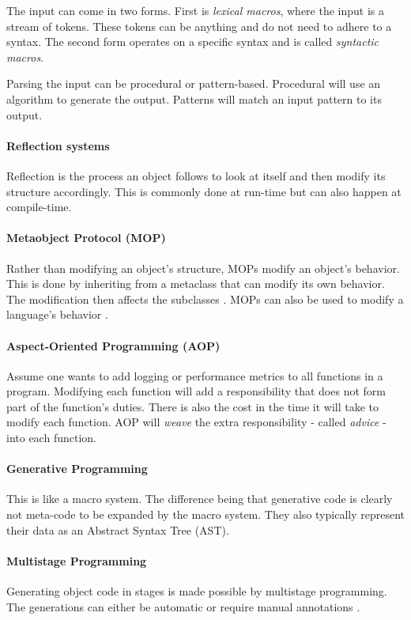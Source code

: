 The input can come in two forms.
First is \textit{lexical macros}, where the input is a stream of tokens.
These tokens can be anything and do not need to adhere to a syntax.
The second form operates on a specific syntax and is called \textit{syntactic macros}.

Parsing the input can be procedural or pattern-based.
Procedural will use an algorithm to generate the output.
Patterns will match an input pattern to its output.

\paragraph{Reflection systems}
Reflection is the process an object follows to look at itself and then modify its structure accordingly.
This is commonly done at run-time but can also happen at compile-time.

\paragraph{Metaobject Protocol (MOP)}
Rather than modifying an object's structure, MOPs modify an object's behavior.
This is done by inheriting from a metaclass that can modify its own behavior.
The modification then affects the subclasses \cite{lee_95_01}.
MOPs can also be used to modify a language's behavior \cite{seaton_15_01}.

\paragraph{Aspect-Oriented Programming (AOP)}
Assume one wants to add logging or performance metrics to all functions in a program.
Modifying each function will add a responsibility that does not form part of the function's duties.
There is also the cost in the time it will take to modify each function.
AOP will \textit{weave} the extra responsibility - called \textit{advice} - into each function.

\paragraph{Generative Programming}
This is like a macro system.
The difference being that generative code is clearly not meta-code to be expanded by the macro system.
They also typically represent their data as an Abstract Syntax Tree (AST). 

\paragraph{Multistage Programming}
Generating object code in stages is made possible by multistage programming.
The generations can either be automatic or require manual annotations \cite{sheard_01_01, taha_04_01}.

